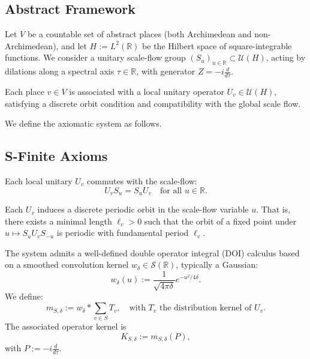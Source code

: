 \subsection{Abstract Framework}

Let \( V \) be a countable set of abstract places (both Archimedean and non-Archimedean), and let \( H := L^2(\mathbb{R}) \) be the Hilbert space of square-integrable functions. We consider a unitary scale-flow group \( (S_u)_{u \in \mathbb{R}} \subset \mathcal{U}(H) \), acting by dilations along a spectral axis \( \tau \in \mathbb{R} \), with generator \( Z = -i \frac{d}{d\tau} \).

Each place \( v \in V \) is associated with a local unitary operator \( U_v \in \mathcal{U}(H) \), satisfying a discrete orbit condition and compatibility with the global scale flow.

We define the axiomatic system as follows.

\subsection{S-Finite Axioms}

\begin{assumption}
Each local unitary \( U_v \) commutes with the scale-flow:
\[
U_v S_u = S_u U_v \quad \text{for all } u \in \mathbb{R}.
\]
\end{assumption}

\begin{assumption}
Each \( U_v \) induces a discrete periodic orbit in the scale-flow variable \( u \). That is, there exists a minimal length \( \ell_v > 0 \) such that the orbit of a fixed point under \( u \mapsto S_u U_v S_{-u} \) is periodic with fundamental period \( \ell_v \).
\end{assumption}

\begin{assumption}
The system admits a well-defined double operator integral (DOI) calculus based on a smoothed convolution kernel \( w_\delta \in \mathcal{S}(\mathbb{R}) \), typically a Gaussian:
\[
w_\delta(u) := \frac{1}{\sqrt{4\pi \delta}} e^{-u^2 / 4\delta}.
\]
We define:
\[
m_{S,\delta} := w_\delta * \sum_{v \in S} T_v, \quad \text{with } T_v \text{ the distribution kernel of } U_v.
\]
The associated operator kernel is
\[
K_{S,\delta} := m_{S,\delta}(P),
\]
with \( P := -i \frac{d}{d\tau} \).
\end{assumption}

